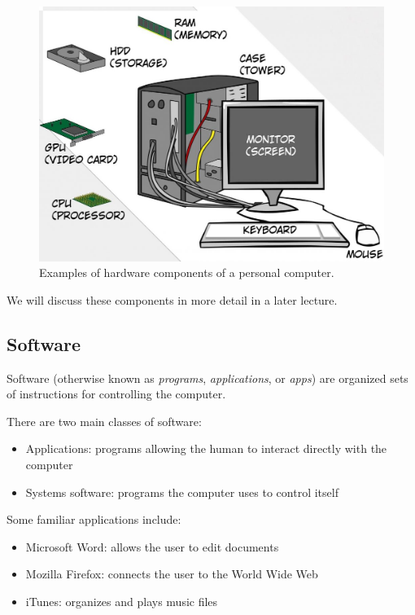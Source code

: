\begin{figure}
	\centering
	\includegraphics[width=\textwidth]{images/hardware-components.jpg}
	\caption{Examples of hardware components of a personal computer.}
	\label{fig:hardware}
\end{figure}

We will discuss these components in more detail in a later lecture. 

\subsection{Software}

Software (otherwise known as \textit{programs}, \textit{applications}, or \textit{apps}) are organized sets of instructions for controlling the computer.

There are two main classes of software:

\begin{itemize}
	\item Applications: programs allowing the human to interact directly with the computer
	\item Systems software: programs the computer uses to control itself
\end{itemize}

Some familiar applications include:

\begin{itemize}
	\item Microsoft Word: allows the user to edit documents
	\item Mozilla Firefox: connects the user to the World Wide Web
	\item iTunes: organizes and plays music files
\end{itemize}

